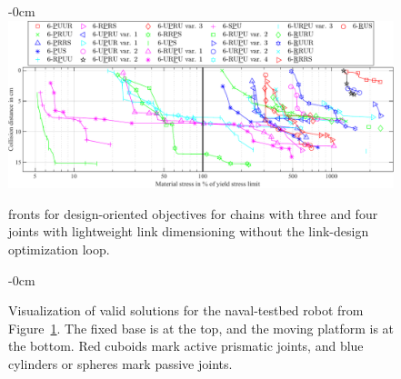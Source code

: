 \begin{figure}[H]
\begin{adjustwidth}{-\extralength}{0cm}
  \centering
  \includegraphics{Figures/lufipkm_pareto_materialstress_colldist_groups_materialstresscolldist_34joints.pdf}
\end{adjustwidth}
\caption[Naval-testbed task:  fronts for design-oriented objectives for chains with three and four joints]{ fronts for design-oriented objectives for chains with three and four joints with lightweight link dimensioning without the link-design optimization loop.}
\label{fig:lufipkm_pareto_materialstresscolldist_34joints}
\end{figure}

\vspace{-12pt}
\begin{figure}[H]
\begin{adjustwidth}{-\extralength}{0cm}
  \centering
  \graphicspath{{Figures}}
  
\end{adjustwidth}
\caption{Visualization %
  of valid solutions for the naval-testbed robot from Figure~\ref{fig:lufipkm_pareto_materialstresscolldist_34joints}. The fixed base is at the top, and the moving platform is at the bottom. Red cuboids mark active prismatic joints, and blue cylinders or spheres mark passive joints.}
\label{fig:lufipkm_robots1}
\end{figure}

